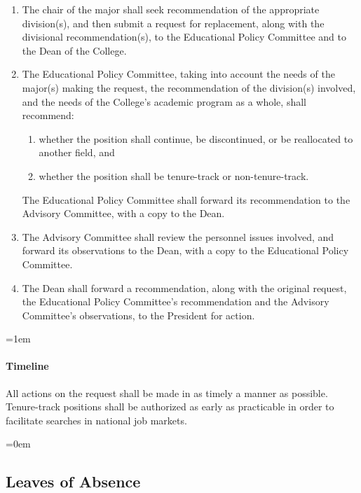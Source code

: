\documentclass{manual}
\let\oldsubsection\subsection
\renewcommand\subsection{\leftskip=0em\oldsubsection}
\let\oldparagraph\paragraph
\renewcommand\paragraph{\leftskip=1em\oldparagraph}
\newcommand{\itemLevelA}{\alph*.}
\newcommand{\itemLevelB}{\arabic*)}
\newcommand{\itemRefA}{\alph*}
\newcommand{\itemRefB}{\arabic*}
\begin{document}
	\begin{enumerate}[label=\itemLevelA,ref=\itemRefA]
	\item  The chair of the major shall seek recommendation of the appropriate division(s), and then submit a request for replacement, along with the divisional recommendation(s), to the Educational Policy Committee and to the Dean of the College.
	\item  The Educational Policy Committee, taking into account the needs of the major(s) making the request, the recommendation of the division(s) involved, and the needs of the College's academic program as a whole, shall recommend:

		\begin{enumerate}[label=\itemLevelB,ref=\itemRefB]
		\item whether the position shall continue, be discontinued, or be reallocated to another field, and
		\item whether the position shall be tenure-track or non-tenure-track.
		\end{enumerate}

	The Educational Policy Committee shall forward its recommendation to the Advisory Committee, with a copy to the Dean.

	\item The Advisory Committee shall review the personnel issues involved, and forward its observations to the Dean, with a copy to the Educational Policy Committee.

	\item The Dean shall forward a recommendation, along with the original request, the Educational Policy Committee's recommendation and the Advisory Committee's observations, to the President for action.

	\end{enumerate}

\paragraph{Timeline} 
All actions on the request shall be made in as timely a manner as possible. Tenure-track positions shall be authorized as early as practicable in order to facilitate searches in national job markets.

\subsection{Leaves of Absence}\label{sec:LeavesOfAbsence}
\end{document}
